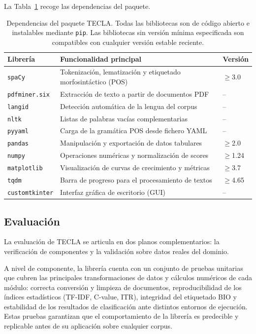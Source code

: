 La Tabla~\ref{tab:dependencias_tecla} recoge las dependencias del paquete.

\begin{table}[H]
\centering
\fontsize{10}{12}\selectfont
\begin{tabular}{@{}p{3.5cm}p{8cm}p{2cm}@{}}
\toprule
\textbf{Librería} & \textbf{Funcionalidad principal} & \textbf{Versión} \\
\midrule
\texttt{spaCy} & Tokenización, lematización y etiquetado morfosintáctico (POS) & $\geq$3.0 \\
\texttt{pdfminer.six} & Extracción de texto a partir de documentos PDF & -- \\
\texttt{langid} & Detección automática de la lengua del corpus & -- \\
\texttt{nltk} & Listas de palabras vacías complementarias & -- \\
\texttt{pyyaml} & Carga de la gramática POS desde fichero YAML & -- \\
\texttt{pandas} & Manipulación y exportación de datos tabulares & $\geq$2.0 \\
\texttt{numpy} & Operaciones numéricas y normalización de scores & $\geq$1.24 \\
\texttt{matplotlib} & Visualización de curvas de crecimiento y métricas & $\geq$3.7 \\
\texttt{tqdm} & Barra de progreso para el procesamiento de textos & $\geq$4.65 \\
\texttt{customtkinter} & Interfaz gráfica de escritorio (GUI) & -- \\
\bottomrule
\end{tabular}
\caption{Dependencias del paquete TECLA. Todas las bibliotecas son de código abierto e instalables mediante \texttt{pip}. Las bibliotecas sin versión mínima especificada son compatibles con cualquier versión estable reciente.}
\label{tab:dependencias_tecla}
\end{table}

\subsection{Evaluación}
\label{subsec:evaluacion_tecla}

La evaluación de TECLA se articula en dos planos complementarios: la verificación de componentes y la validación sobre datos reales del dominio.

A nivel de componente, la librería cuenta con un conjunto de pruebas unitarias que cubren las principales transformaciones de datos y cálculos numéricos de cada módulo: correcta conversión y limpieza de documentos, reproducibilidad de los índices estadísticos (TF-IDF, C-value, ITR), integridad del etiquetado BIO y estabilidad de los resultados de clasificación ante distintos entornos de ejecución. Estas pruebas garantizan que el comportamiento de la librería es predecible y replicable antes de su aplicación sobre cualquier corpus.

